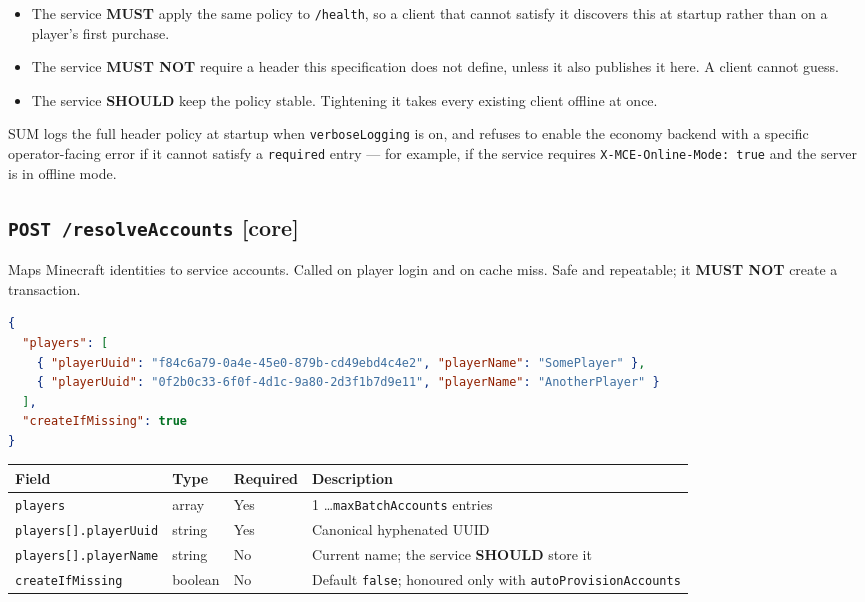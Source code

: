 \documentclass[11pt,a4paper]{article}
\newcommand{\code}[1]{\texttt{\small #1}}
\newcommand{\req}{\textbf{MUST}}
\newcommand{\rec}{\textbf{SHOULD}}
\newcommand{\core}{{\small\color{omceAccentDark}\textbf{[core]}}}
\begin{document}
\begin{itemize}
\item The service \req{} apply the same policy to \code{/health}, so a client that cannot satisfy it
      discovers this at startup rather than on a player's first purchase.
\item The service \textbf{MUST NOT} require a header this specification does not define, unless it
      also publishes it here. A client cannot guess.
\item The service \rec{} keep the policy stable. Tightening it takes every existing client offline
      at once.
\end{itemize}

SUM logs the full header policy at startup when \code{verboseLogging} is on, and refuses to enable
the economy backend with a specific operator-facing error if it cannot satisfy a \code{required}
entry --- for example, if the service requires \code{X-MCE-Online-Mode: true} and the server is in
offline mode.

\subsection{\code{POST /resolveAccounts} \core}

Maps Minecraft identities to service accounts. Called on player login and on cache miss. Safe and
repeatable; it \textbf{MUST NOT} create a transaction.

\begin{lstlisting}[language=json]
{
  "players": [
    { "playerUuid": "f84c6a79-0a4e-45e0-879b-cd49ebd4c4e2", "playerName": "SomePlayer" },
    { "playerUuid": "0f2b0c33-6f0f-4d1c-9a80-2d3f1b7d9e11", "playerName": "AnotherPlayer" }
  ],
  "createIfMissing": true
}
\end{lstlisting}

\begin{tabularx}{\linewidth}{L{4.6cm} L{1.6cm} L{1.6cm} X}
\toprule
\textbf{Field} & \textbf{Type} & \textbf{Required} & \textbf{Description}\\
\midrule
\code{players}              & array   & Yes & 1 \ldots \code{maxBatchAccounts} entries\\
\code{players[].playerUuid} & string  & Yes & Canonical hyphenated UUID\\
\code{players[].playerName} & string  & No  & Current name; the service \rec{} store it\\
\code{createIfMissing}      & boolean & No  & Default \code{false}; honoured only with \code{autoProvisionAccounts}\\
\bottomrule
\end{tabularx}
\end{document}
